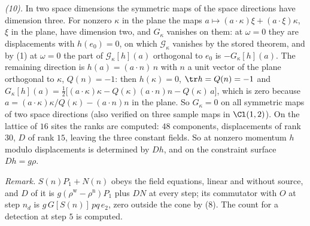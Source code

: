 \emph{(10).} In two space dimensions the symmetric maps of the space directions have dimension three. For nonzero $\kappa$ in the plane the maps $a \mapsto (a\cdot\kappa)\xi + (a\cdot\xi)\kappa$, $\xi$ in the plane, have dimension two, and $G_{\kappa}$ vanishes on them: at $\omega = 0$ they are displacements with $h(e_{0}) = 0$, on which $\mathcal{G}_{\kappa}$ vanishes by the stored theorem, and by (1) at $\omega = 0$ the part of $\mathcal{G}_{\kappa}[h](a)$ orthogonal to $e_{0}$ is $-G_{\kappa}[h](a)$. The remaining direction is $h(a) = (a\cdot n)\,n$ with $n$ a unit vector of the plane orthogonal to $\kappa$, $Q(n) = -1$: then $h(\kappa) = 0$, $\tr h = Q(n) = -1$ and $G_{\kappa}[h](a) = \tfrac12\bigl[(a\cdot\kappa)\kappa - Q(\kappa)(a\cdot n)n - Q(\kappa)\,a\bigr]$, which is zero because $a = (a\cdot\kappa)\kappa/Q(\kappa) - (a\cdot n)n$ in the plane. So $G_{\kappa} = 0$ on all symmetric maps of two space directions (also verified on three sample maps in $\Cl(1,2)$). On the lattice of $16$ sites the ranks are computed: $48$ components, displacements of rank $30$, $D$ of rank $15$, leaving the three constant fields. So at nonzero momentum $h$ modulo displacements is determined by $Dh$, and on the constraint surface $Dh = g\rho$.

\emph{Remark.} $S(n)P_{1} + N(n)$ obeys the field equations, linear and without source, and $D$ of it is $g(\rho^{\mathrm{w}} - \rho^{\mathrm{n}})P_{1}$ plus $D N$ at every step; its commutator with $O$ at step $n_{d}$ is $g\,G[S(n)]\,pq\,e_{2}$, zero outside the cone by (8). The count for a detection at step $5$ is computed.
